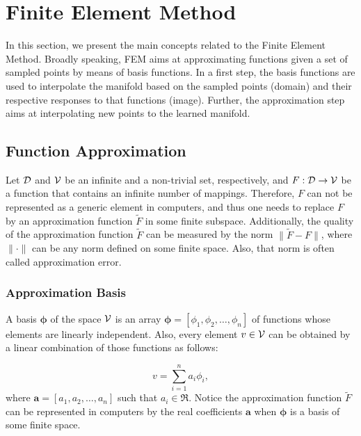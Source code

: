 \section{Finite Element Method}
\label{s.fem}

In this section, we present the main concepts related to the Finite Element Method. Broadly speaking, FEM aims at approximating functions given a set of sampled points by means of basis functions. In a first step, the basis functions are used to interpolate the manifold based on the sampled points (domain) and their respective responses to that functions (image). Further, the approximation step aims at interpolating new points to the learned manifold.

\subsection{Function Approximation}
\label{ss.function}

Let ${\cal D}$ and ${\cal V}$ be an infinite and a non-trivial set, respectively, and $F:{\cal D}\rightarrow{\cal V}$ be a function that contains an infinite number of mappings. Therefore, $F$ can not be represented as a generic element in computers, and thus one needs to replace $F$ by an approximation function $\tilde{F}$ in some finite subspace. Additionally, the quality of the approximation function $\tilde{F}$ can be measured by the norm $\|\tilde{F}-F\|$, where $\|\cdot\|$ can be any norm defined on some finite space. Also, that norm is often called approximation error.

\subsubsection{Approximation Basis}
\label{sss.basis}

A basis $\mathbf{\phi}$ of the space ${\cal V}$ is an array  $\mathbf{\phi}=[\phi_1,\phi_2,\ldots,\phi_n]$ of functions whose elements are linearly independent. Also, every element $v\in{\cal V}$ can be obtained by a linear combination of those functions as follows:

\begin{equation}
	v=\sum_{i=1}^na_i\phi_i,
\end{equation}
where $\mathbf{a}=[a_1,a_2,\ldots,a_n]$ such that $a_i\in\Re$. Notice the approximation function $\tilde{F}$ can be represented in computers by the real coefficients $\mathbf{a}$ when $\mathbf{\phi}$ is a basis of some finite space.

